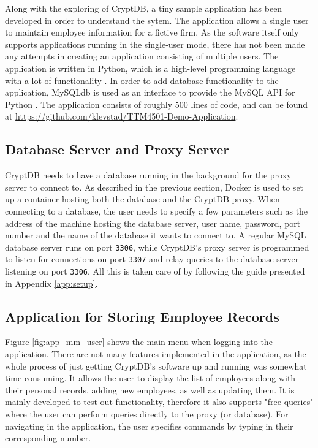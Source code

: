 Along with the exploring of CryptDB, a tiny sample application has been developed in order to understand the sytem. The application allows a single user to maintain employee information for a fictive firm. As the software itself only supports applications running in the single-user mode, there has not been made any attempts in creating an application consisting of multiple users. The application is written in Python, which is a high-level programming language with a lot of functionality \cite{python}. In order to add database functionality to the application, MySQLdb is used as an interface to provide the MySQL API for Python \cite{mysqldb}. The application consists of roughly 500 lines of code, and can be found at \url{https://github.com/klevstad/TTM4501-Demo-Application}.

\subsection{Database Server and Proxy Server}

CryptDB needs to have a database running in the background for the proxy server to connect to. As described in the previous section, Docker is used to set up a container hosting both the database and the CryptDB proxy. When connecting to a database, the user needs to specify a few parameters such as the address of the machine hosting the database server, user name, password, port number and the name of the database it wants to connect to. A regular MySQL database server runs on port \verb!3306!, while CryptDB's proxy server is programmed to listen for connections on port \verb!3307! and relay queries to the database server listening on port \verb!3306!. All this is taken care of by following the guide presented in Appendix \ref{app:setup}.

\subsection{Application for Storing Employee Records}

Figure \ref{fig:app_mm_user} shows the main menu when logging into the application. There are not many features implemented in the application, as the whole process of just getting CryptDB's software up and running was somewhat time consuming. It allows the user to display the list of employees along with their personal records, adding new employees, as well as updating them. It is mainly developed to test out functionality, therefore it also supports "free queries" where the user can perform queries directly to the proxy (or database). For navigating in the application, the user specifies commands by typing in their corresponding number.

